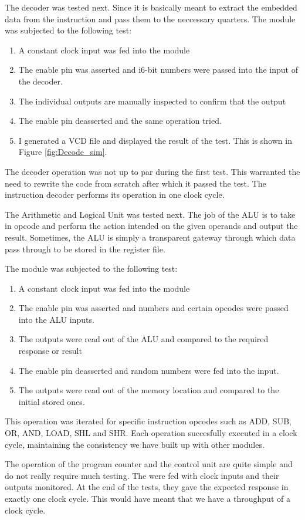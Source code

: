 The decoder was tested next. Since it is basically meant to extract the embedded data from the instruction and pass them to the neccessary quarters. The module was subjected to the following test:
\begin{enumerate}
\item A constant clock input was fed into the module
\item The enable pin was asserted and i6-bit numbers were passed into the input of the decoder.
\item The individual outputs are manually inspected to confirm that the output  
\item The enable pin deasserted and the same operation tried.
\item I generated a VCD file and displayed the result of the test. This is shown in Figure \ref{fig:Decode_sim}.
\end{enumerate}
The decoder operation was not up to par during the first test. This warranted the need to rewrite the code from scratch after which it passed the test. The instruction decoder performs its operation in one clock cycle.

The Arithmetic and Logical Unit was tested next. The job of the ALU is to take in opcode and perform the action intended on the given operands and output the result. Sometimes, the ALU is simply a transparent gateway through which data pass through to be stored in the register file. 

The module was subjected to the following test:
\begin{enumerate}
\item A constant clock input was fed into the module
\item The enable pin was asserted and numbers and certain opcodes were passed into the ALU inputs.
\item The outputs were read out of the ALU and compared to the required response or result
\item The enable pin deasserted and random numbers were fed into the input.
\item The outputs were read out of the memory location and compared to the initial stored ones.
\end{enumerate}

This operation was iterated for specific instruction opcodes such as ADD, SUB, OR, AND, LOAD, SHL and SHR. Each operation succesfully executed in a clock cycle, maintaining the consistency we have built up with other modules.

The operation of the program counter and the control unit are quite simple and do not really require much testing. The were fed  with clock inputs and their outputs  monitored. At the end of the tests, they gave the expected response in exactly one clock cycle. This would have meant that we have a throughput of a clock cycle.

